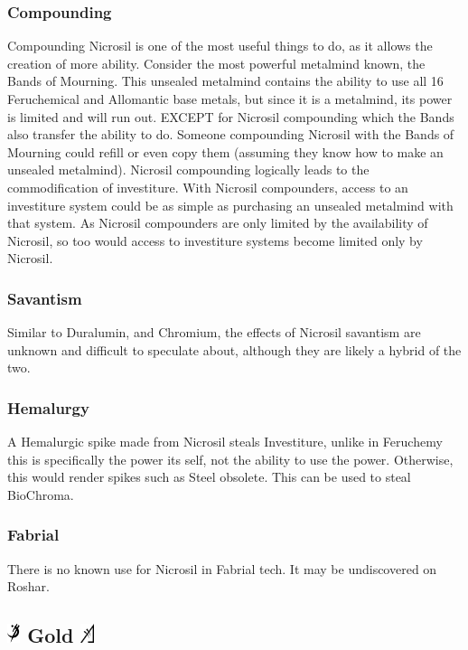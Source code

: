 \documentclass[conference]{IEEEtran}
\begin{document}
\subsubsection*{\textbf{Compounding}}
Compounding Nicrosil is one of the most useful things to do, as it allows the creation of more ability.  Consider the most powerful metalmind known, the Bands of Mourning.  This unsealed metalmind contains the ability to use all 16 Feruchemical and Allomantic base metals,\cite{BoM-CH28} but since it is a metalmind, its power is limited and will run out.\cite{TFE-CH22}  EXCEPT for Nicrosil compounding which the Bands also transfer the ability to do.  Someone compounding Nicrosil with the Bands of Mourning could refill or even copy them (assuming they know how to make an unsealed metalmind).  Nicrosil compounding logically leads to the commodification of investiture.  With Nicrosil compounders, access to an investiture system could be as simple as purchasing an unsealed metalmind with that system.  As Nicrosil compounders are only limited by the availability of Nicrosil, so too would access to investiture systems become limited only by Nicrosil. \\
\subsubsection*{\textbf{Savantism}}
Similar to Duralumin, and Chromium, the effects of Nicrosil savantism are unknown and difficult to speculate about, although they are likely a hybrid of the two.\\
\subsubsection*{\textbf{Hemalurgy}}
A Hemalurgic spike made from Nicrosil steals Investiture,\cite{HE-TB} unlike in Feruchemy this is specifically the power its self, not the ability to use the power.\cite{PvAvI}  Otherwise, this would render spikes such as Steel obsolete.  This can be used to steal BioChroma.\cite{PvAvI}\\
\subsubsection*{\textbf{Fabrial}}
There is no known use for Nicrosil in Fabrial tech.  It may be undiscovered on Roshar.
\subsection*{\includegraphics[height=1em]{images/Gold.png}  \textbf{Gold} \includegraphics[height=1em]{images/Gold_(Feruchemy).png}}
\end{document}
